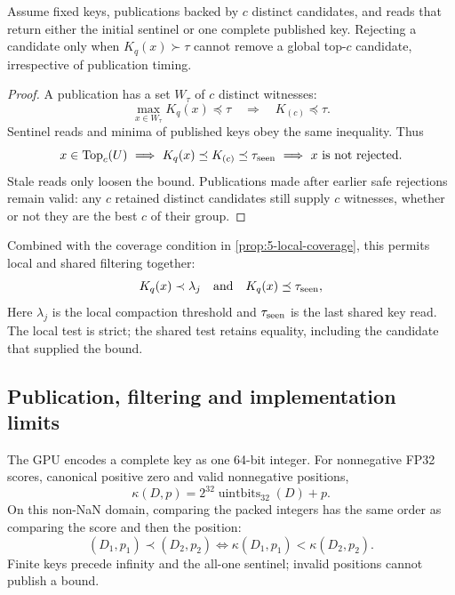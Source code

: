 \begin{resultblock}
\begin{proposition}
\label{prop:5-shared-bound}
Assume fixed keys, publications backed by $c$ distinct candidates, and
reads that return either the initial sentinel or one complete published
key. Rejecting a candidate only when $K_q(x)\succ\tau$ cannot remove a
global top-$c$ candidate, irrespective of publication timing.
\end{proposition}
\begin{proof}
A publication has a set $W_\tau$ of $c$ distinct witnesses:
\[
 \max_{x\in W_\tau}K_q(x)\preceq\tau
 \quad\Longrightarrow\quad K_{(c)}\preceq\tau.
\]
Sentinel reads and minima of published keys obey the same inequality. Thus
\[
 x\in\operatorname{Top}_c(U)
 \ \Longrightarrow\ K_q(x)\preceq K_{(c)}\preceq\tau_{\rm seen}
 \ \Longrightarrow\ x\text{ is not rejected}.
\]
Stale reads only loosen the bound. Publications
made after earlier safe rejections remain valid: any $c$ retained
distinct candidates still supply $c$ witnesses, whether or not they are
the best $c$ of their group.
\end{proof}
\end{resultblock}
Combined with the coverage condition in \cref{prop:5-local-coverage},
this permits local and shared filtering together:
\begin{equation}
 K_q(x)\prec\lambda_j
 \quad\text{and}\quad
 K_q(x)\preceq\tau_{\rm seen},
 \label{eq:5-admission}
\end{equation}
Here $\lambda_j$ is the local compaction threshold and $\tau_{\rm seen}$
is the last shared key read. The local test is strict; the shared test
retains equality, including the candidate that supplied the bound.

\subsection{Publication, filtering and implementation limits}

The GPU encodes a complete key as one 64-bit integer. For nonnegative
FP32 scores, canonical positive zero and valid nonnegative positions,
\begin{equation}
 \kappa(D,p)=2^{32}\operatorname{uintbits}_{32}(D)+p.
 \label{eq:5-packed-key}
\end{equation}
On this non-NaN domain, comparing the packed integers has the same order
as comparing the score and then the position:
\[
 (D_1,p_1)\prec(D_2,p_2)\iff\kappa(D_1,p_1)<\kappa(D_2,p_2).
\]
Finite keys precede infinity and the all-one sentinel; invalid positions
cannot publish a bound.


